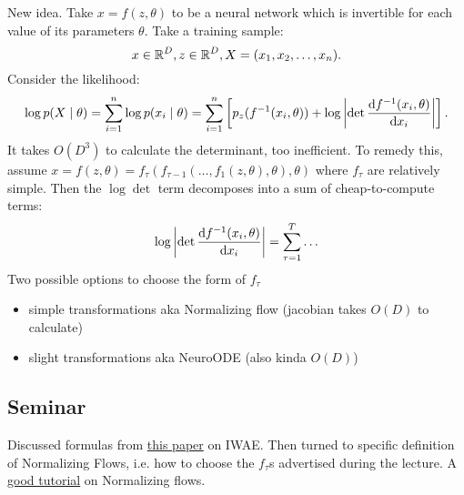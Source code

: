 New idea. Take $x = f(z, \theta)$ to be a neural network which is invertible for each value of its parameters $\theta$.
Take a training sample:
\[
    x \in \operatorname{\mathbb{R}}^D, z \in \operatorname{\mathbb{R}}^D, X = (x_1, x_2, \ldots, x_n)
.\]
Consider the likelihood:
\[
    \log p(X \mid \theta) = \sum_{i=1}^{n} \log p(x_i \mid \theta) = 
    \sum_{i=1}^{n} \left[ p_z(f^{-1}(x_i, \theta)) + \log\abs{\det \dv{f^{-1}(x_i, \theta)}{x_i}} \right]
.\]
It takes $O(D^3)$ to calculate the determinant, too inefficient.
To remedy this, assume $x=f(z, \theta) = f_{\tau}(f_{\tau-1}(\ldots, f_1(z, \theta), \theta), \theta)$ where $f_{\tau}$ are relatively simple.
Then the $\log\det$ term decomposes into a sum of cheap-to-compute terms:
\[
    \log\abs{\det \dv{f^{-1}(x_i, \theta)}{x_i}} = \sum_{\tau=1}^{T} \ldots
\]
Two possible options to choose the form of $f_{\tau}$
\begin{itemize}
    \item simple transformations aka Normalizing flow (jacobian takes $O(D)$ to calculate)
    \item slight transformations aka NeuroODE (also kinda $O(D)$)
\end{itemize}

\subsection{Seminar}

Discussed formulas from \href{https://casmls.github.io/general/2017/04/24/iwae-aae.html}{this paper} on IWAE.
Then turned to specific definition of Normalizing Flows, i.e. how to choose the $f_{\tau}$s advertised during the lecture.
A \href{https://arxiv.org/pdf/1908.09257.pdf}{good tutorial} on Normalizing flows.
